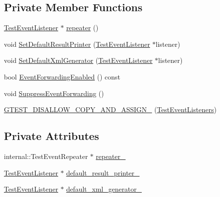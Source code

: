 \subsection*{Private Member Functions}
\begin{DoxyCompactItemize}
\item 
\hyperlink{classtesting_1_1TestEventListener}{Test\+Event\+Listener} $\ast$ \hyperlink{classtesting_1_1TestEventListeners_a3de1e101514bdba3e74b93adc604e9c4}{repeater} ()
\item 
void \hyperlink{classtesting_1_1TestEventListeners_aeaab55da7c18c35fb12c27c18ff99955}{Set\+Default\+Result\+Printer} (\hyperlink{classtesting_1_1TestEventListener}{Test\+Event\+Listener} $\ast$listener)
\item 
void \hyperlink{classtesting_1_1TestEventListeners_a36dbac47563ef8bb78cb467d11f5b4d9}{Set\+Default\+Xml\+Generator} (\hyperlink{classtesting_1_1TestEventListener}{Test\+Event\+Listener} $\ast$listener)
\item 
bool \hyperlink{classtesting_1_1TestEventListeners_aa1878baf16a50f30f6435fad3c68ef3f}{Event\+Forwarding\+Enabled} () const
\item 
void \hyperlink{classtesting_1_1TestEventListeners_a7132550dc1c50bb3399a6d6d3fc9be3d}{Suppress\+Event\+Forwarding} ()
\item 
\hyperlink{classtesting_1_1TestEventListeners_a31d12292abc277dedbb7dc7748a6a60e}{G\+T\+E\+S\+T\+\_\+\+D\+I\+S\+A\+L\+L\+O\+W\+\_\+\+C\+O\+P\+Y\+\_\+\+A\+N\+D\+\_\+\+A\+S\+S\+I\+G\+N\+\_\+} (\hyperlink{classtesting_1_1TestEventListeners}{Test\+Event\+Listeners})
\end{DoxyCompactItemize}
\subsection*{Private Attributes}
\begin{DoxyCompactItemize}
\item 
internal\+::\+Test\+Event\+Repeater $\ast$ \hyperlink{classtesting_1_1TestEventListeners_a625d58b951893e80cde12862aece6fd8}{repeater\+\_\+}
\item 
\hyperlink{classtesting_1_1TestEventListener}{Test\+Event\+Listener} $\ast$ \hyperlink{classtesting_1_1TestEventListeners_a9ff9ebc31a9a52e5f108661cfcb7ecd9}{default\+\_\+result\+\_\+printer\+\_\+}
\item 
\hyperlink{classtesting_1_1TestEventListener}{Test\+Event\+Listener} $\ast$ \hyperlink{classtesting_1_1TestEventListeners_a018a3952aa10c19251b88f27abe373d3}{default\+\_\+xml\+\_\+generator\+\_\+}
\end{DoxyCompactItemize}
